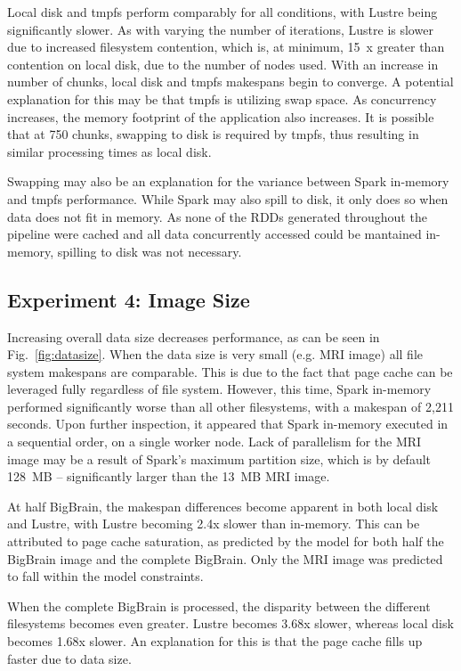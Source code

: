 \documentclass{IEEEtran}
\begin{document}
Local disk and tmpfs perform comparably for all 
conditions, with Lustre being significantly slower. As with varying the number 
of iterations, Lustre is slower due to increased filesystem contention, which 
is, at minimum, 15~x greater than contention on local disk, due to the number of nodes
used. With an increase in 
number of chunks, local disk and tmpfs makespans begin to converge. A potential 
explanation for this may be that tmpfs is utilizing swap space. As concurrency 
increases, the memory footprint of the application also increases. It is 
possible that at 750 chunks, swapping to disk is required by tmpfs, thus 
resulting in similar processing times as local disk.


Swapping may also be an explanation for the variance between Spark in-memory 
and tmpfs performance. While Spark may also spill to disk, it only does so when
data does not fit in memory. As none of the RDDs generated throughout the 
pipeline were cached and all data concurrently accessed could be mantained 
in-memory, spilling to disk was not necessary.

\subsection{Experiment 4: Image Size}

Increasing overall data size decreases performance, as can be seen in 
Fig.~\ref{fig:datasize}. When the data size is very small (e.g. MRI image) all 
file system makespans are comparable. This is due to the 
fact that page cache can be leveraged fully regardless of file system. However, 
this time, Spark in-memory performed significantly worse than all other 
filesystems, with a makespan of 2,211 seconds. Upon further inspection,
it appeared that Spark in-memory executed
in a sequential order, on a single worker node. Lack of parallelism for the MRI 
image may be a result of Spark's maximum partition size, which is by default 128~MB
-- significantly larger than the 13~MB MRI image. 

At half BigBrain, the makespan differences become apparent in both local disk 
and Lustre, with Lustre becoming 2.4x slower than in-memory. This 
can be attributed to page cache saturation, as predicted by the model for both 
half the BigBrain image and the complete BigBrain. Only the MRI image was 
predicted to fall within the model constraints. 

When the complete BigBrain is processed, the disparity between the different 
filesystems becomes even greater. Lustre becomes 3.68x slower, whereas local 
disk becomes 1.68x slower. An explanation for this is that the page cache fills 
up faster due to data size.
\end{document}
